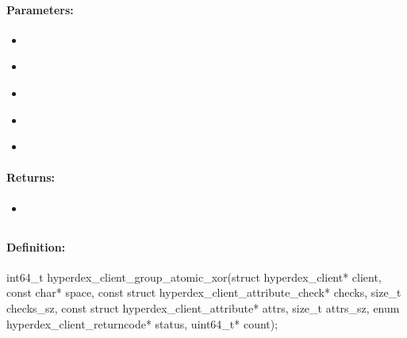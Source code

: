 \paragraph{Parameters:}
\begin{itemize}[noitemsep]
\item {}\\

\item {}\\

\item {}\\

\item {}\\

\item {}\\

\end{itemize}

\paragraph{Returns:}
\begin{itemize}[noitemsep]
\item {}\\

\end{itemize}

\pagebreak
\subsection{}
\label{api:c:group_atomic_xor}


\paragraph{Definition:}
\begin{ccode}
int64_t hyperdex_client_group_atomic_xor(struct hyperdex_client* client,
        const char* space,
        const struct hyperdex_client_attribute_check* checks, size_t checks_sz,
        const struct hyperdex_client_attribute* attrs, size_t attrs_sz,
        enum hyperdex_client_returncode* status,
        uint64_t* count);
\end{ccode}

